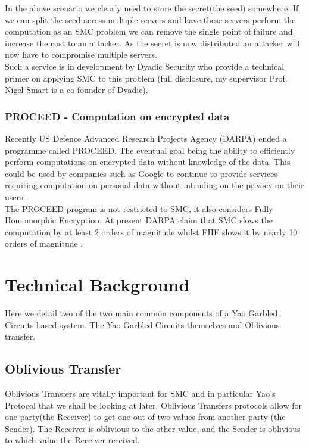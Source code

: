 \documentclass[ %
                    author={Nicholas Tutte},
                supervisor={Prof. Nigel Smart},
                    degree={MEng},
                     title={Secure Two Party Computation},
                  subtitle={A practical comparison of recent protocols},
                      type={Research - GG1K},
                      year={2015} ]{dissertation}
\begin{document}
				In the above scenario we clearly need to store the secret(the seed) somewhere. If we can split the seed across multiple servers and have these servers perform the computation as an SMC problem we can remove the single point of failure and increase the cost to an attacker. As the secret is now distributed an attacker will now have to compromise multiple servers.\\

				Such a service is in development by Dyadic Security who provide a technical primer on applying SMC to this problem \cite{DYADIC_MPC_Primer} (full disclosure, my supervisor Prof. Nigel Smart is a co-founder of Dyadic).

			\subsection{PROCEED - Computation on encrypted data} \label{sub2:PROCEED_DARPA}
				Recently US Defence Advanced Research Projects Agency (DARPA) ended a programme called PROCEED. The eventual goal being the ability to efficiently perform computations on encrypted data without knowledge of the data. This could be used by companies such as Google to continue to provide services requiring computation on personal data without intruding on the privacy on their users.\\

				The PROCEED program is not restricted to SMC, it also considers Fully Homomorphic Encryption. At present DARPA claim that SMC slows the computation by at least 2 orders of magnitude whilst FHE slows it by nearly 10 orders of magnitude \cite{DARPAPROceed}. 


	
	\chapter{Technical Background}
		Here we detail two of the two main common components of a Yao Garbled Circuits based system. The Yao Garbled Circuits themselves and Oblivious transfer.

		\section{Oblivious Transfer} \label{sec:OT_Intro}
			Oblivious Transfers are vitally important for SMC and in particular Yao's Protocol that we shall be looking at later. Oblivious Transfers protocols allow for one party(the Receiver) to get one out-of two values from another party (the Sender). The Receiver is oblivious to the other value, and the Sender is oblivious to which value the Receiver received.\\
\end{document}
